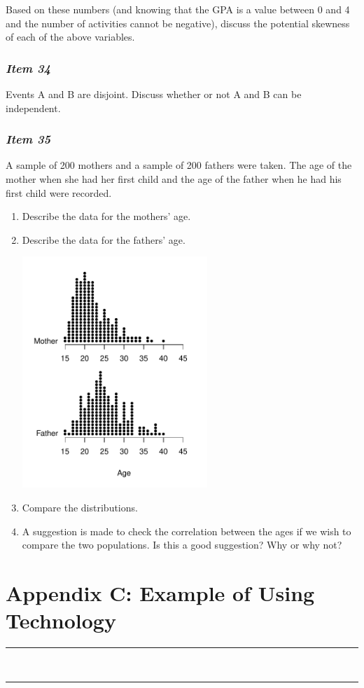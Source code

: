 \documentclass[twoside,openany]{tufte-book}
\begin{document}
Based on these numbers (and knowing that the GPA is a value between 0 and 4 and the number of activities cannot be negative), discuss the potential skewness of each of the above variables.

\subsection{\textbf{\textit{Item 34}}}
Events A and B are disjoint.  Discuss whether or not A and B can be independent. 

\subsection{\textbf{\textit{Item 35}}}
A sample of 200 mothers and a sample of 200 fathers were taken.  The age of the mother when she had her first child and the age of the father when he had his first child were recorded.

\begin{enumerate}[leftmargin=1cm, itemsep=.2em]
\item Describe the data for the mothers' age.
\item Describe the data for the fathers' age.
\begin{marginfigure}
\includegraphics[width=2.75in]{Item35.pdf}
\end{marginfigure}
\item Compare the distributions.
\item A suggestion is made to check the correlation between the ages if we wish to compare the two populations.  Is this a good suggestion?  Why or why not?
\end{enumerate}

\chapter{Appendix C: Example of Using Technology}
\vspace{-.53in}
   \noindent\color{graylight}\rule[0cm]{3.25in}{0.03cm} \\
    \noindent\color{graylight}\rule[0.4cm]{3.25in}{0.03cm} \\
\color{black}
\end{document}
